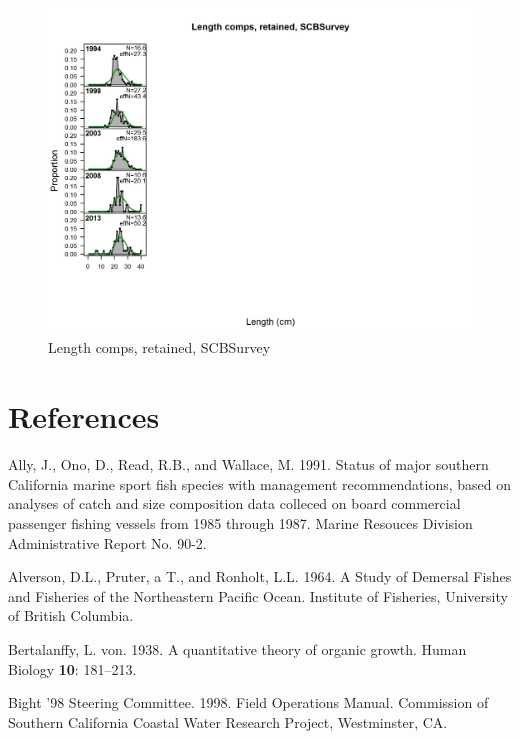 \documentclass[12pt,]{article}
\begin{document}
\begin{figure}[htbp]
\centering
\includegraphics{./r4ss/plots_mod1/comp_lenfit_flt11mkt2.png}
\caption{Length comps, retained, SCBSurvey
\label{fig:mod1_13_comp_lenfit_flt11mkt2}}
\end{figure}

\newpage

\color{black}

\section*{References}\label{references}

\renewcommand{\thepage}{}

\hypertarget{refs}{}
\hypertarget{ref-Ally1991}{}
Ally, J., Ono, D., Read, R.B., and Wallace, M. 1991. Status of major
southern California marine sport fish species with management
recommendations, based on analyses of catch and size composition data
colleced on board commercial passenger fishing vessels from 1985 through
1987. Marine Resouces Division Administrative Report No. 90-2.

\hypertarget{ref-Alverson1964}{}
Alverson, D.L., Pruter, a T., and Ronholt, L.L. 1964. A Study of
Demersal Fishes and Fisheries of the Northeastern Pacific Ocean.
Institute of Fisheries, University of British Columbia.

\hypertarget{ref-vonB1938}{}
Bertalanffy, L. von. 1938. A quantitative theory of organic growth.
Human Biology \textbf{10}: 181--213.

\hypertarget{ref-Bight1998}{}
Bight '98 Steering Committee. 1998. Field Operations Manual. Commission
of Southern California Coastal Water Research Project, Westminster, CA.
\end{document}
